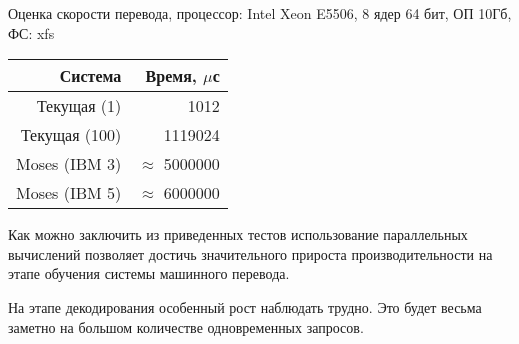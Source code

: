 \begin{dtable}{Оценка скорости перевода, процессор: Intel Xeon E5506, 8 ядер 64 бит, ОП 10Гб, ФС: xfs}
	\begin{tabular}{|r|r|}
		\hline  \textbf{Система}	&	Время, $\mu$с \\ 
		\hline  Текущая (1)			&	1012 \\ 
		\hline  Текущая (100)		&	1119024  \\ 
		\hline  Moses (IBM 3)		&	$\approx$ 5000000\\ 
		\hline  Moses (IBM 5) 		& 	$\approx$ 6000000 \\ 
		\hline 
	\end{tabular} 
\end{dtable}

Как можно заключить из приведенных тестов использование параллельных вычислений позволяет 
достичь значительного прироста производительности на этапе обучения системы машинного перевода.

На этапе декодирования особенный рост наблюдать трудно. 
Это будет весьма заметно на большом количестве одновременных запросов.
 
\pagebreak


